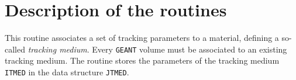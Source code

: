            
           
\section*{Description of the routines}
This routine associates a set of tracking parameters to a material, defining
a so-called {\it tracking medium}. Every {\tt GEANT} volume must be 
associated to an existing tracking medium. The routine
stores the parameters of the tracking
medium {\tt ITMED} in the data structure {\tt JTMED}.
